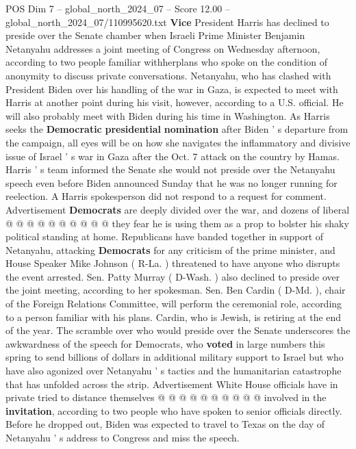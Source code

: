 \begin{textsample}{POS Dim 7 – global\_north\_2024\_07 – Score 12.00 – global\_north\_2024\_07/110995620.txt}  \label{ex:f7_pos_045}
\textbf{Vice} President Harris has declined to preside over the Senate chamber when Israeli Prime Minister Benjamin Netanyahu addresses a joint meeting of Congress on Wednesday afternoon, according to two people familiar withherplans who spoke on the condition of anonymity to discuss private conversations.
Netanyahu, who has clashed with President Biden over his handling of the war in Gaza, is expected to meet with Harris at another point during his visit, however, according to a U.S. official.
He will also probably meet with Biden during his time in Washington.
As Harris seeks the \textbf{Democratic} \textbf{presidential} \textbf{nomination} after Biden ' s departure from the campaign, all eyes will be on how she navigates the inflammatory and divisive issue of Israel ' s war in Gaza after the Oct. 7 attack on the country by Hamas.
Harris ' s team informed the Senate she would not preside over the Netanyahu speech even before Biden announced Sunday that he was no longer running for reelection.
A Harris spokesperson did not respond to a request for comment.
Advertisement \textbf{Democrats} are deeply divided over the war, and dozens of liberal @ @ @ @ @ @ @ @ @ @ they fear he is using them as a prop to bolster his shaky political standing at home.
Republicans have banded together in support of Netanyahu, attacking \textbf{Democrats} for any criticism of the prime minister, and House Speaker Mike Johnson ( R-La. ) threatened to have anyone who disrupts the event arrested.
Sen.
Patty Murray ( D-Wash. ) also declined to preside over the joint meeting, according to her spokesman.
Sen.
Ben Cardin ( D-Md. ), chair of the Foreign Relations Committee, will perform the ceremonial role, according to a person familiar with his plans.
Cardin, who is Jewish, is retiring at the end of the year.
The scramble over who would preside over the Senate underscores the awkwardness of the speech for Democrats, who \textbf{voted} in large numbers this spring to send billions of dollars in additional military support to Israel but who have also agonized over Netanyahu ' s tactics and the humanitarian catastrophe that has unfolded across the strip.
Advertisement White House officials have in private tried to distance themselves @ @ @ @ @ @ @ @ @ @ involved in the \textbf{invitation}, according to two people who have spoken to senior officials directly.
Before he dropped out, Biden was expected to travel to Texas on the day of Netanyahu ' s address to Congress and miss the speech.

\end{textsample}

